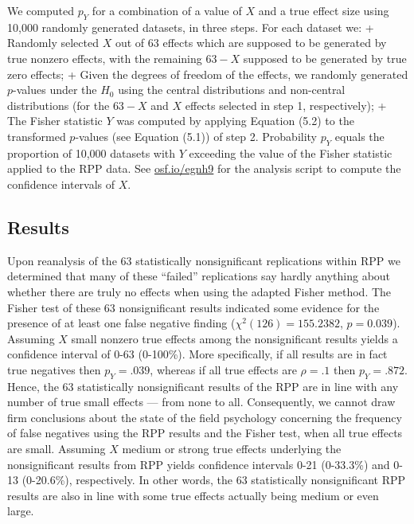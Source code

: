 \documentclass[a5paper]{book}
\begin{document}
We computed \(p_Y\) for a combination of a value of \(X\) and a true
effect size using 10,000 randomly generated datasets, in three steps.
For each dataset we: + Randomly selected \(X\) out of 63 effects which
are supposed to be generated by true nonzero effects, with the remaining
\(63-X\) supposed to be generated by true zero effects; + Given the
degrees of freedom of the effects, we randomly generated \(p\)-values
under the \(H_0\) using the central distributions and non-central
distributions (for the \(63-X\) and \(X\) effects selected in step 1,
respectively); + The Fisher statistic \(Y\) was computed by applying
Equation (5.2) to the transformed \(p\)-values (see Equation (5.1)) of
step 2. Probability \(p_Y\) equals the proportion of 10,000 datasets
with \(Y\) exceeding the value of the Fisher statistic applied to the
RPP data. See \href{https://osf.io/egnh9}{osf.io/egnh9} for the analysis
script to compute the confidence intervals of \(X\).

\subsection{Results}\label{results-2}

Upon reanalysis of the 63 statistically nonsignificant replications
within RPP we determined that many of these \enquote{failed}
replications say hardly anything about whether there are truly no
effects when using the adapted Fisher method. The Fisher test of these
63 nonsignificant results indicated some evidence for the presence of at
least one false negative finding (\(\chi^2(126)=155.2382\),
\(p=0.039\)). Assuming \(X\) small nonzero true effects among the
nonsignificant results yields a confidence interval of 0-63 (0-100\%).
More specifically, if all results are in fact true negatives then
\(p_Y=.039\), whereas if all true effects are \(\rho=.1\) then
\(p_Y=.872\). Hence, the 63 statistically nonsignificant results of the
RPP are in line with any number of true small effects --- from none to
all. Consequently, we cannot draw firm conclusions about the state of
the field psychology concerning the frequency of false negatives using
the RPP results and the Fisher test, when all true effects are small.
Assuming \(X\) medium or strong true effects underlying the
nonsignificant results from RPP yields confidence intervals 0-21
(0-33.3\%) and 0-13 (0-20.6\%), respectively. In other words, the 63
statistically nonsignificant RPP results are also in line with some true
effects actually being medium or even large.
\end{document}
